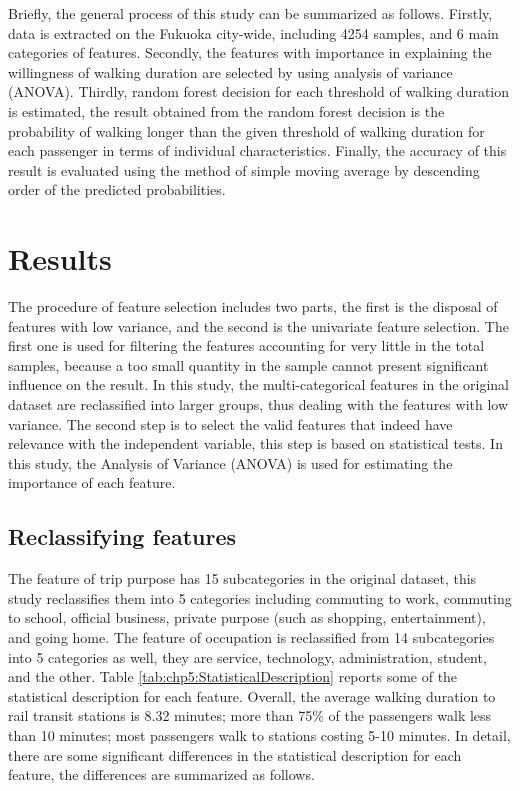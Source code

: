 %
Briefly, the general process of this study can be summarized as follows. Firstly, data is extracted on the Fukuoka city-wide, including 4254 samples, and 6 main categories of features. Secondly, the features with importance in explaining the willingness of walking duration are selected by using analysis of variance (ANOVA). Thirdly, random forest decision for each threshold of walking duration is estimated, the result obtained from the random forest decision is the probability of walking longer than the given threshold of walking duration for each passenger in terms of individual characteristics. Finally, the accuracy of this result is evaluated using the method of simple moving average by descending order of the predicted probabilities.

%
\section{Results}
The procedure of feature selection includes two parts, the first is the disposal of features with low variance, and the second is the univariate feature selection. The first one is used for filtering the features accounting for very little in the total samples, because a too small quantity in the sample cannot present significant influence on the result. In this study, the multi-categorical features in the original dataset are reclassified into larger groups, thus dealing with the features with low variance. The second step is to select the valid features that indeed have relevance with the independent variable, this step is based on statistical tests. In this study, the Analysis of Variance (ANOVA) is used for estimating the importance of each feature.

%
\subsection{Reclassifying features}
The feature of trip purpose has 15 subcategories in the original dataset, this study reclassifies them into 5 categories including commuting to work, commuting to school, official business, private purpose (such as shopping, entertainment), and going home. The feature of occupation is reclassified from 14 subcategories into 5 categories as well, they are service, technology, administration, student, and the other. Table \ref{tab:chp5:StatisticalDescription} reports some of the statistical description for each feature. Overall, the average walking duration to rail transit stations is 8.32 minutes; more than 75\% of the passengers walk less than 10 minutes; most passengers walk to stations costing 5-10 minutes. In detail, there are some significant differences in the statistical description for each feature, the differences are summarized as follows.

